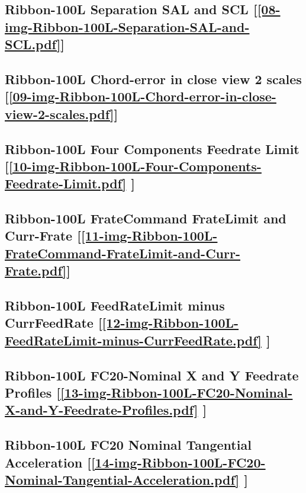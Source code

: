 \subsection       {Ribbon-100L Separation SAL and SCL
	[\ref      {08-img-Ribbon-100L-Separation-SAL-and-SCL.pdf}] }
\label{ssec-08-img-Ribbon-100L-Separation-SAL-and-SCL.pdf}

\subsection       {Ribbon-100L Chord-error in close view 2 scales
	[\ref      {09-img-Ribbon-100L-Chord-error-in-close-view-2-scales.pdf}] }
\label{ssec-09-img-Ribbon-100L-Chord-error-in-close-view-2-scales.pdf}

\subsection       {Ribbon-100L Four Components Feedrate Limit
	[\ref      {10-img-Ribbon-100L-Four-Components-Feedrate-Limit.pdf} ] }
\label{ssec-10-img-Ribbon-100L-Four-Components-Feedrate-Limit.pdf}

\subsection    {Ribbon-100L FrateCommand FrateLimit and Curr-Frate
	[\ref      {11-img-Ribbon-100L-FrateCommand-FrateLimit-and-Curr-Frate.pdf}] }
\label{ssec-11-img-Ribbon-100L-FrateCommand-FrateLimit-and-Curr-Frate.pdf}

\subsection     {Ribbon-100L FeedRateLimit minus CurrFeedRate
	[\ref      {12-img-Ribbon-100L-FeedRateLimit-minus-CurrFeedRate.pdf} ] }
\label{ssec-12-img-Ribbon-100L-FeedRateLimit-minus-CurrFeedRate.pdf}

\subsection     {Ribbon-100L FC20-Nominal X and Y Feedrate Profiles
	[\ref      {13-img-Ribbon-100L-FC20-Nominal-X-and-Y-Feedrate-Profiles.pdf} ] }
\label{ssec-13-img-Ribbon-100L-FC20-Nominal-X-and-Y-Feedrate-Profiles.pdf}

\subsection     {Ribbon-100L FC20 Nominal Tangential Acceleration
	[\ref      {14-img-Ribbon-100L-FC20-Nominal-Tangential-Acceleration.pdf} ] }
\label{ssec-14-img-Ribbon-100L-FC20-Nominal-Tangential-Acceleration.pdf}

